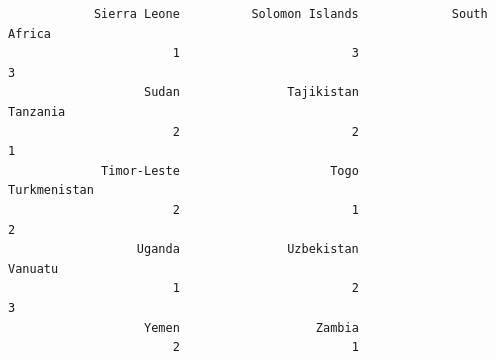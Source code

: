 \documentclass[
]{article}
\newenvironment{Shaded}{}{}
\newcommand{\AttributeTok}[1]{#1}
\newcommand{\DecValTok}[1]{#1}
\newcommand{\FunctionTok}[1]{#1}
\newcommand{\NormalTok}[1]{#1}
\newcommand{\OtherTok}[1]{\textcolor[rgb]{1.00,0.25,0.00}{#1}}
\newcommand{\SpecialCharTok}[1]{\textcolor[rgb]{0.00,0.50,0.50}{#1}}
\begin{document}
\begin{verbatim}
            Sierra Leone          Solomon Islands             South Africa 
                       1                        3                        3 
                   Sudan               Tajikistan                 Tanzania 
                       2                        2                        1 
             Timor-Leste                     Togo             Turkmenistan 
                       2                        1                        2 
                  Uganda               Uzbekistan                  Vanuatu 
                       1                        2                        3 
                   Yemen                   Zambia 
                       2                        1 
\end{verbatim}

\begin{Shaded}
\end{Shaded}
\end{document}
